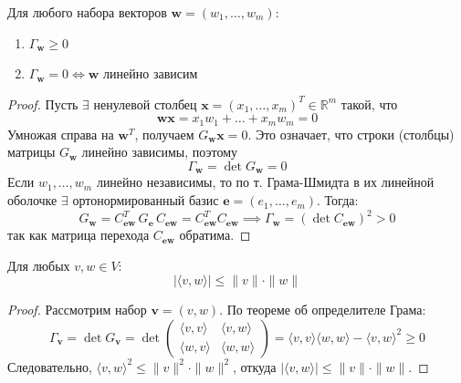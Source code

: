 \begin{theorem}
    Для любого набора векторов $\mathbf{w} = (w_1, \dots, w_m)$:
    \begin{enumerate}
        \item $\Gamma_{\mathbf{w}} \ge 0$
        \item $\Gamma_{\mathbf{w}} = 0 \iff \mathbf{w}$ линейно зависим
    \end{enumerate}
    \begin{proof}
        Пусть $\exists$ ненулевой столбец $\mathbf{x} = (x_1, \dots, x_m)^T \in \mathbb{R}^m$ такой, что
        \[
            \mathbf{w}\mathbf{x} = x_1 w_1 + \dots + x_m w_m = 0
        \]
        Умножая справа на $\mathbf{w}^T$, получаем $G_{\mathbf{w}}\mathbf{x} = 0$.
        Это означает, что строки (столбцы) матрицы $G_{\mathbf{w}}$ линейно зависимы, поэтому
        \[
            \Gamma_{\mathbf{w}} = \det G_{\mathbf{w}} = 0
        \]
        Если $w_1, \dots, w_m$ линейно независимы, то по т. Грама-Шмидта в их линейной оболочке $\exists$ ортонормированный базис $\mathbf{e} = (e_1, \dots, e_m)$. Тогда:
        \[
            G_{\mathbf{w}} = C_{\mathbf{e}\mathbf{w}}^T\, G_{\mathbf{e}}\, C_{\mathbf{e}\mathbf{w}} = C_{\mathbf{e}\mathbf{w}}^T C_{\mathbf{e}\mathbf{w}}
            \implies \Gamma_{\mathbf{w}} = (\det C_{\mathbf{e}\mathbf{w}})^2 > 0
        \]
        так как матрица перехода $C_{\mathbf{e}\mathbf{w}}$ обратима.
    \end{proof}
\end{theorem}



\begin{theorem}
    Для любых $v, w \in V$:
    \[
        |\langle v, w \rangle| \le \|v\| \cdot \|w\|
    \]
    \begin{proof}
        Рассмотрим набор $\mathbf{v} = (v, w)$. По теореме об определителе Грама:
        \[
            \Gamma_{\mathbf{v}} = \det G_{\mathbf{v}}
            = \det \begin{pmatrix} \langle v,v\rangle & \langle v,w\rangle \\ \langle w,v\rangle & \langle w,w\rangle \end{pmatrix}
            = \langle v,v\rangle\langle w,w\rangle - \langle v,w\rangle^2 \ge 0
        \]
        Следовательно, $\langle v,w\rangle^2 \le \|v\|^2 \cdot \|w\|^2$, откуда $|\langle v,w\rangle| \le \|v\|\cdot\|w\|$.
    \end{proof}
\end{theorem}

